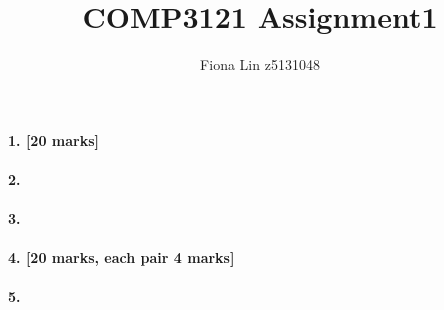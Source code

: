 \documentclass[a4paper]{scrartcl}
\title{COMP3121 Assignment1}
\author{Fiona Lin z5131048}
\begin{document}
\maketitle
\paragraph{1. [20 marks]}
\label{sec:Question 1}

\paragraph{2.}
\label{sec:Question 2}

\paragraph{3.}
\label{sec:Question 3}

\paragraph{4. [20 marks, each pair 4 marks]}
\label{sec:Question 4}

\paragraph{5.}
\label{sec:Question 5}
\end{document}
